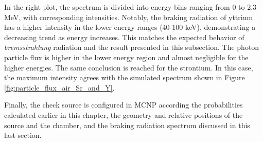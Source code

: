 In the right plot, the spectrum is divided into energy bins ranging from 0 to 2.3 \unit{\mega\electronvolt}, with corresponding intensities. Notably, the braking radiation of yttrium has a higher intensity in the lower energy ranges (40-100 \unit{\kilo\electronvolt}), demonstrating a decreasing trend as energy increases. This matches the expected behavior of \emph{bremsstrahlung} radiation and the result presented in this subsection. The photon particle flux is higher in the lower energy region and almost negligible for the higher energies. The same conclusion is reached for the strontium. In this case, the maximum intensity agrees with the simulated spectrum shown in Figure \ref{fig:particle_flux_air_Sr_and_Y}.%


Finally, the check source is configured in MCNP according the probabilities calculated earlier in this chapter, the geometry and relative positions of the source and the chamber, and the braking radiation spectrum discussed in this last section. 